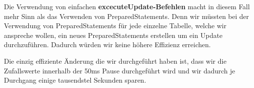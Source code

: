 Die Verwendung von einfachen \textbf{excecuteUpdate-Befehlen} macht in diesem
Fall mehr Sinn als das Verwenden von PreparedStatements. Denn wir müssten bei der
Verwendung von PreparedStatements für jede einzelne Tabelle, welche wir
anspreche wollen, ein neues PreparedStatements erstellen um ein Update
durchzuführen. Dadurch würden wir keine höhere Effizienz erreichen.

Die einzig effiziente Änderung die wir durchgeführt haben ist, dass wir die
Zufallswerte innerhalb der 50ms Pause durchgeführt wird und wir dadurch je
Durchgang einige tausendstel Sekunden sparen.

\clearpage